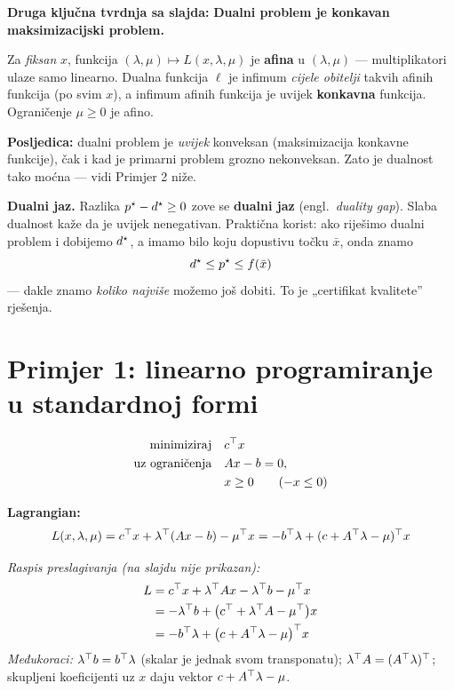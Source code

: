 \textbf{Druga ključna tvrdnja sa slajda:} \textbf{Dualni problem je konkavan
maksimizacijski problem.}

\begin{napomena}
Za \emph{fiksan} $x$, funkcija $(\lambda,\mu) \mapsto L(x,\lambda,\mu)$ je
\textbf{afina} u $(\lambda,\mu)$ --- multiplikatori ulaze samo linearno. Dualna
funkcija $\ell$ je infimum \emph{cijele obitelji} takvih afinih funkcija (po
svim $x$), a infimum afinih funkcija je uvijek \textbf{konkavna} funkcija.
Ograničenje $\mu \ge 0$ je afino.

\textbf{Posljedica:} dualni problem je \emph{uvijek} konveksan (maksimizacija
konkavne funkcije), čak i kad je primarni problem grozno nekonveksan. Zato je
dualnost tako moćna --- vidi Primjer 2 niže.
\end{napomena}

\textbf{Dualni jaz.} Razlika $p\opt - d\opt \ge 0$ zove se \textbf{dualni jaz}
(engl.\ \emph{duality gap}). Slaba dualnost kaže da je uvijek nenegativan.
Praktična korist: ako riješimo dualni problem i dobijemo $d\opt$, a imamo bilo
koju dopustivu točku $\bar x$, onda znamo
\[
d\opt \le p\opt \le f(\bar x)
\]
--- dakle znamo \emph{koliko najviše} možemo još dobiti. To je „certifikat
kvalitete” rješenja.

\section{Primjer 1: linearno programiranje u standardnoj formi}
\label{sec:dual-lp}

\begin{equation}
\begin{aligned}
\minim & c\T x \\
\uzogr & Ax - b = 0, \\
       & x \ge 0 \qquad (-x \le 0)
\end{aligned}
\end{equation}

\textbf{Lagrangian:}
\[
L(x,\lambda,\mu) = c\T x + \lambda\T(Ax-b) - \mu\T x
= -b\T\lambda + (c + A\T\lambda - \mu)\T x
\]

\emph{Raspis preslagivanja (na slajdu nije prikazan):}
\begin{align}
L &= c\T x + \lambda\T Ax - \lambda\T b - \mu\T x \\
  &= -\lambda\T b + \big(c\T + \lambda\T A - \mu\T\big)x \\
  &= -b\T\lambda + \big(c + A\T\lambda - \mu\big)\T x
\end{align}
\emph{Međukoraci:} $\lambda\T b = b\T\lambda$ (skalar je jednak svom
transponatu); $\lambda\T A = (A\T\lambda)\T$; skupljeni koeficijenti uz $x$ daju
vektor $c + A\T\lambda - \mu$.

